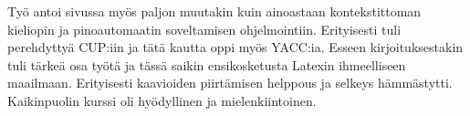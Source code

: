 \documentclass[a4paper,12pt,finnish]{article}
\begin{document}
Työ antoi sivussa myös paljon muutakin kuin ainoastaan kontekstittoman kieliopin ja pinoautomaatin soveltamisen ohjelmointiin. Erityisesti tuli perehdyttyä CUP:iin ja tätä kautta oppi myös YACC:ia. Esseen kirjoituksestakin tuli tärkeä osa työtä ja tässä saikin ensikosketusta Latexin ihmeelliseen maailmaan. Erityisesti kaavioiden piirtämisen helppous ja selkeys hämmästytti. Kaikinpuolin kurssi oli hyödyllinen ja mielenkiintoinen.
 
\end{document}
